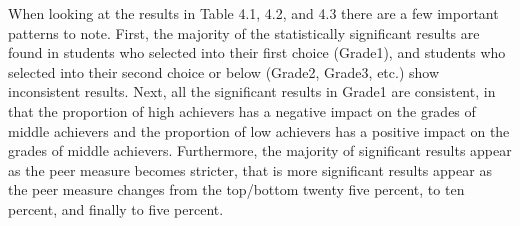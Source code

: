 \clearpage{}

When looking at the results in Table 4.1, 4.2, and 4.3 there are a few important patterns to note. 
First, the majority of the statistically significant results are found in students who selected into their first choice (Grade1), and students who selected into their second choice or below (Grade2, Grade3, etc.) show inconsistent results. 
Next, all the significant results in Grade1 are consistent, in that the proportion of high achievers has a negative impact on the grades of middle achievers and the proportion of low achievers has a positive impact on the grades of middle achievers. 
Furthermore, the majority of significant results appear as the peer measure becomes stricter, that is more significant results appear as the peer measure changes from the top/bottom twenty five percent, to ten percent, and finally to five percent. 

